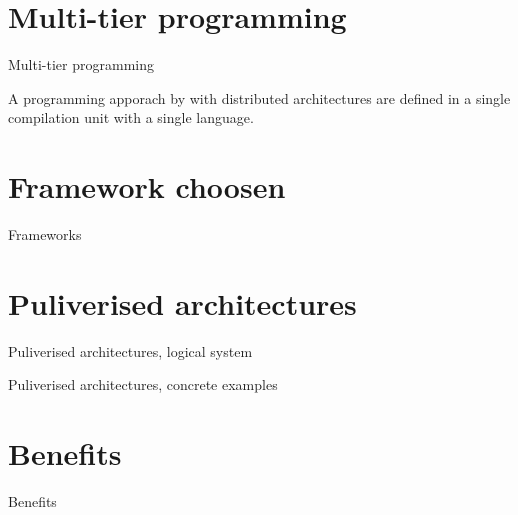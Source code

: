 \documentclass[aspectratio=169]{beamer}
\begin{document}
\section{Multi-tier programming}

\begin{frame}{Multi-tier programming}
\begin{cardTiny}
{\color{accent} A programming apporach by with distributed architectures are defined in a single compilation unit with a single language. }
\end{cardTiny}
\centering
{}
\end{frame}

\section{Framework choosen}
\begin{frame}{Frameworks}
\begin{card}
\end{card}
\pause
\begin{card}[ScalaLoci]

\end{card}

\end{frame}

\section{Puliverised architectures}
\begin{frame}{Puliverised architectures, logical system}

\end{frame}
\begin{frame}{Puliverised architectures, concrete examples}

\end{frame}

\section{Benefits}
\begin{frame}{Benefits}

\end{frame}
\end{document}
